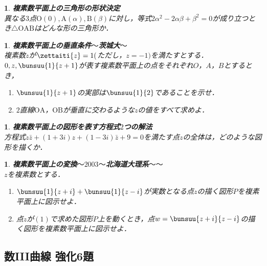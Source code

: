 \documentclass[10pt,
fleqn,
dvipdfmx,
uplatex
]{jsarticle}
\newtheorem{question}[Question]{}
\begin{document}
\begin{question}{\bf\boldmath 複素数平面上の三角形の形状決定}\\
異なる$3$点$\text{O}\left(0\right), \text{A}\left(\alpha \right), \text{B}\left(\beta \right)$に対し，等式$2\alpha ^2-2\alpha \beta +\beta ^2=0$が成り立つとき$\triangle \text{OAB}$はどんな形の三角形か．
\end{question}



\begin{question}{\bf\boldmath 複素数平面上の垂直条件$〜$茨城大$〜$}\\
複素数$z$が$\zettaiti{z}=1($ただし，$z=-1)$を満たすとする．
$0, z, \bunsuu{1}{{}z+1}$が表す複素数平面上の点をそれぞれ$O$，$A$，$B$とするとき，
\begin{enumerate}
\item $\bunsuu{1}{{}z+1}$の実部は$\bunsuu{1}{2}$であることを示せ．
\item $2$直線$\text{OA}$，$\text{OB}$が垂直に交わるような$z$の値をすべて求めよ．
\end{enumerate}

\end{question}



\begin{question}{\bf\boldmath 複素数平面上の図形を表す方程式$2$つの解法}\\
方程式$z\bar{z}+\left(1+3i\right)z+\left(1-3i\right)\bar{z}+9=0$を満たす点$z$の全体は，どのような図形を描くか．
\end{question}



\begin{question}{\bf\boldmath 複素数平面上の変換$〜2003〜$北海道大理系$〜〜$}\\
$z$を複素数とする．
\begin{enumerate}
\item $\bunsuu{1}{{}z+i}+\bunsuu{1}{{}z-i}$が実数となる点$z$の描く図形$P$を複素平面上に図示せよ．
\item 点$z$が$\left(1\right)$で求めた図形$P$上を動くとき，点$w=\bunsuu{{z+i}}{{z-i}}$の描く図形を複素数平面上に図示せよ．
\end{enumerate}

\end{question}

\subsection{数III曲線 強化6題}
\end{document}

